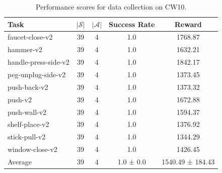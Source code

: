 \begin{table}[]
    \centering
    \caption{Performance scores for data collection on CW10.}
    \begin{tabular}{l c c c c}
    \toprule
                    \textbf{Task} & $|\mathcal{S}|$ & $|\mathcal{A}|$ & \textbf{Success Rate} &      \textbf{Reward} \\
    \midrule
         faucet-close-v2 &  39 & 4 &  1.0 &    1768.87 \\
               hammer-v2 &  39 & 4 &  1.0 &    1632.21 \\
    handle-press-side-v2 &  39 & 4 &  1.0 &    1842.17 \\
      peg-unplug-side-v2 &  39 & 4 &  1.0 &    1373.45 \\
            push-back-v2 &  39 & 4 &  1.0 &    1373.32 \\
                 push-v2 &  39 & 4 &  1.0 &    1672.88 \\
            push-wall-v2 &  39 & 4 &  1.0 &    1594.37 \\
          shelf-place-v2 &  39 & 4 &  1.0 &    1376.92 \\
           stick-pull-v2 &  39 & 4 &  1.0 &    1344.29 \\
         window-close-v2 &  39 & 4 &  1.0 &    1426.45 \\
    \midrule
                 Average &  39 & 4 &  1.0 ± 0.0 & 1540.49 ± 184.43 \\
    \bottomrule
    \end{tabular}
    \label{tab:cw10}
\end{table}

